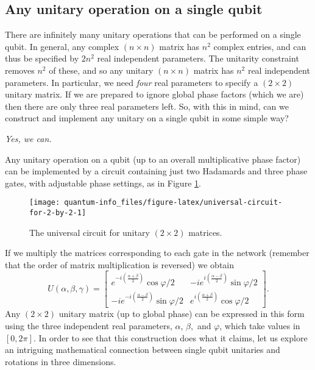 \documentclass{article}
\begin{document}
\hypertarget{any-unitary-operation-on-a-single-qubit}{%
\subsection{Any unitary operation on a single qubit}\label{any-unitary-operation-on-a-single-qubit}}

There are infinitely many unitary operations that can be performed on a single qubit.
In general, any complex \((n\times n)\) matrix has \(n^2\) complex entries, and can thus be specified by \(2n^2\) real independent parameters.
The unitarity constraint removes \(n^2\) of these, and so any unitary \((n\times n)\) matrix has \(n^2\) real independent parameters.
In particular, we need \emph{four} real parameters to specify a \((2\times 2)\) unitary matrix.
If we are prepared to ignore global phase factors (which we are) then there are only three real parameters left.
So, with this in mind, can we construct and implement any unitary on a single qubit in some simple way?

\emph{Yes, we can.}

Any unitary operation on a qubit (up to an overall multiplicative phase factor) can be implemented by a circuit containing just two Hadamards and three phase gates, with adjustable phase settings, as in Figure \ref{fig:universal-circuit-for-2-by-2}.



\begin{figure}[H]

{\centering \texttt{[image: quantum-info\_files/figure-latex/universal-circuit-for-2-by-2-1]} 

}

\caption{The universal circuit for unitary \((2\times2)\) matrices.}\label{fig:universal-circuit-for-2-by-2}
\end{figure}

If we multiply the matrices corresponding to each gate in the network (remember that the order of matrix multiplication is reversed) we obtain
\[
  U(\alpha,\beta,\gamma)
  =\begin{bmatrix}
    e^{-i\left(\frac{\alpha+\beta}{2}\right)}\cos\varphi/2
    & -ie^{i\left(\frac{\alpha-\beta}{2}\right)}\sin\varphi/2
  \\-ie^{-i\left(\frac{\alpha-\beta}{2}\right)}\sin\varphi/2
    & e^{i\left(\frac{\alpha+\beta}{2}\right)}\cos\varphi/2
  \end{bmatrix}.
\]
Any \((2\times 2)\) unitary matrix (up to global phase) can be expressed in this form using the three independent real parameters, \(\alpha\), \(\beta,\) and \(\varphi\), which take values in \([0,2\pi]\).
In order to see that this construction does what it claims, let us explore an intriguing mathematical connection between single qubit unitaries and rotations in three dimensions.
\end{document}
